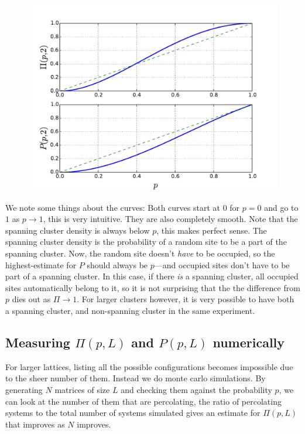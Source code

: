 \documentclass[a4paper, 11pt, notitlepage, english]{article}
\begin{document}
\begin{figure}[ht]
\centering
\includegraphics[width=\textwidth]{11.pdf}
\end{figure}

\newpage
We note some things about the curves: Both curves start at $0$ for $p=0$ and go to $1$ as $p\to 1$, this is very intuitive. They are also completely smooth. Note that the spanning cluster density is always below $p$, this makes perfect sense. The spanning cluster density is the probability of a random site to be a part of the spanning cluster. Now, the random site doesn't \emph{have} to be occupied, so the highest-estimate for $P$ should always be $p$---and occupied sites don't have to be part of a spanning cluster. In this case, if there \emph{is} a spanning cluster, all occupied sites automatically belong to it, so it is not surprising that the the difference from $p$ dies out as $\Pi\to 1$. For larger clusters however, it is very possible to have both a spanning cluster, and non-spanning cluster in the same experiment.

\subsection*{Measuring $\Pi(p,L)$ and $P(p, L)$ numerically}

For larger lattices, listing all the possible configurations becomes impossible due to the sheer number of them. Instead we do monte carlo simulations. By generating $N$ matrices of size $L$ and checking them against the probability $p$, we can look at the number of them that are percolating, the ratio of percolating systems to the total number of systems simulated gives an estimate for $\Pi(p,L)$ that improves as $N$ improves.
\end{document}
